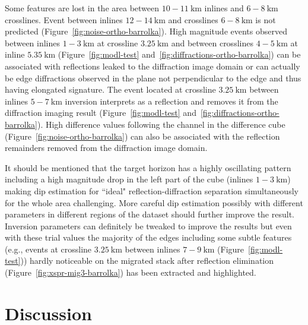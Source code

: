 Some features are lost in the area between $10-11\ \text{km}$ inlines and $6-8\ \text{km}$ crosslines. Event between inlines $12-14\ \text{km}$
and crosslines $6-8\ \text{km}$ is not predicted (Figure~\ref{fig:noise-ortho-barrolka}).
High magnitude events observed between inlines $1-3\ \text{km}$ at crossline $3.25\ \text{km}$ and between crosslines $4-5\ \text{km}$ at inline $5.35\ \text{km}$
(Figure~\ref{fig:modl-test} and~\ref{fig:diffractions-ortho-barrolka})
can be associated with reflections leaked to the diffraction image domain
or can actually be edge diffractions observed in the plane not perpendicular to the edge and thus having elongated signature.
The event located at crossline $3.25\ \text{km}$ between inlines $5-7\ \text{km}$ inversion interprets as a reflection and removes it
from the diffraction imaging result (Figure~\ref{fig:modl-test} and~\ref{fig:diffractions-ortho-barrolka}).
High difference values following the channel in the difference cube (Figure~\ref{fig:noise-ortho-barrolka})
can also be associated with the reflection remainders removed from the diffraction image domain.

It should be mentioned that the target horizon has a highly oscillating pattern including a high magnitude drop
in the left part of the cube (inlines $1-3\ \text{km}$) making dip estimation for ``ideal" reflection-diffraction separation simultaneously for the whole area challenging. More careful
dip estimation possibly with different parameters in different regions of the dataset should further improve the result. Inversion parameters can definitely be tweaked
to improve the results but even with these trial values the majority of the edges including some subtle features
(e.g., events at crossline $3.25\ \text{km}$ between inlines $7-9\ \text{km}$ (Figure~\ref{fig:modl-test})) hardly noticeable on
the migrated stack after reflection elimination (Figure~\ref{fig:xspr-mig3-barrolka})
has been extracted and highlighted. 

\section{Discussion}


